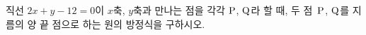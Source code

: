 직선 $2x+y-12=0$이 $x$축, $y$축과 만나는 점을 각각 $\mathrm{P}$, $\mathrm{Q}$라 할 때, 두 점~$\mathrm{P}$, $\mathrm{Q}$를 지름의 양 끝 점으로 하는 원의 방정식을 구하시오.
